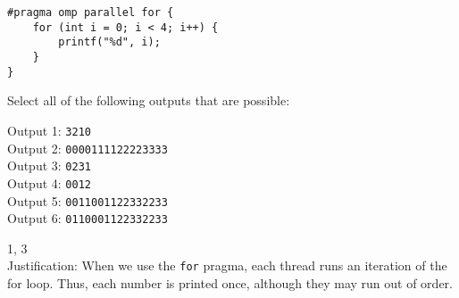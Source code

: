 \begin{blocksection}

\question
\begin{verbatim}
#pragma omp parallel for {
    for (int i = 0; i < 4; i++) {
        printf("%d", i);
    }
}
\end{verbatim}

Select all of the following outputs that are possible:

Output 1: \texttt{3210} \\
Output 2: \texttt{0000111122223333} \\
Output 3: \texttt{0231} \\
Output 4: \texttt{0012} \\
Output 5: \texttt{0011001122332233} \\
Output 6: \texttt{0110001122332233} \\

\begin{solution}[0.5in]
1, 3 \\
Justification: When we use the \texttt{for} pragma, each thread runs an iteration of the for loop. Thus, each number is printed once, although they may run out of order.

\end{solution}
\end{blocksection}